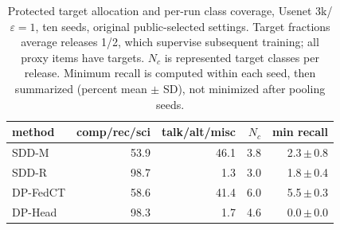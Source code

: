 \begin{table}[t]
\centering
\caption{Protected target allocation and per-run class coverage, Usenet 3k/$\varepsilon=1$, ten seeds, original public-selected settings. Target fractions average releases 1/2, which supervise subsequent training; all proxy items have targets. $N_c$ is represented target classes per release. Minimum recall is computed within each seed, then summarized (percent mean $\pm$ SD), not minimized after pooling seeds.}
\label{tab:target-coverage}
\small\setlength{\tabcolsep}{3pt}
\begin{tabular}{@{}lrrrr@{}}\toprule
method & comp/rec/sci & talk/alt/misc & $N_c$ & min recall \\\midrule
SDD-M & 53.9 & 46.1 & 3.8 & 2.3\,$\pm$\,0.8 \\
SDD-R & 98.7 & 1.3 & 3.0 & 1.8\,$\pm$\,0.4 \\
DP-FedCT & 58.6 & 41.4 & 6.0 & 5.5\,$\pm$\,0.3 \\
DP-Head & 98.3 & 1.7 & 4.6 & 0.0\,$\pm$\,0.0 \\
\bottomrule\end{tabular}
\end{table}
